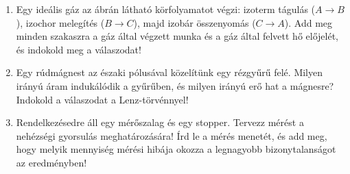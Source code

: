 \documentclass[11pt,a4paper]{article}
\begin{document}
\begin{enumerate}[leftmargin=*,label=\textbf{\arabic*.},itemsep=7pt,topsep=0pt,parsep=0pt]
\item
\begin{minipage}[t]{0.55\linewidth}
Egy ideális gáz az ábrán látható körfolyamatot végzi: izoterm tágulás
($A\!\to\!B$), izochor melegítés ($B\!\to\!C$), majd izobár összenyomás
($C\!\to\!A$). Add meg minden szakaszra a gáz által végzett munka és a gáz által
felvett hő előjelét, és indokold meg a válaszodat!
\end{minipage}\hfill
\begin{minipage}[t]{0.42\linewidth}
\vspace{0pt}
\centering
{}
\end{minipage}

\item Egy rúdmágnest az északi pólusával közelítünk egy rézgyűrű felé. Milyen
irányú áram indukálódik a gyűrűben, és milyen irányú erő hat a mágnesre? Indokold
a válaszodat a Lenz-törvénnyel!

\item Rendelkezésedre áll egy mérőszalag és egy stopper. Tervezz mérést a
nehézségi gyorsulás meghatározására! Írd le a mérés menetét, és add meg, hogy
melyik mennyiség mérési hibája okozza a legnagyobb bizonytalanságot az
eredményben!

\end{enumerate}
\end{document}

